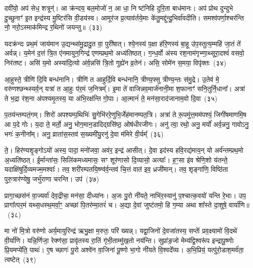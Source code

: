 दवी॑यो॒ अप॑ सेध॒ शत्रून्॑। आ क्र॑न्दय॒ बल॒मोजो॑ न॒ आ धा॒ नि ष्ट॑निहि दुरि॒ता बाध॑मानः। अप॑ प्रोथ दुन्दुभे दु॒च्छुनाꣳ॑ इ॒त इन्द्र॑स्य मु॒ष्टिर॑सि वी॒डय॑स्व। आमूर॑ज प्र॒त्याव॑र्तये॒माः के॑तु॒मद्दु॑न्दु॒भिर्वा॑वदीति। समश्व॑पर्णा॒श्चर॑न्ति नो॒ नरो॒\-ऽस्माक॑मिन्द्र र॒थिनो॑ जयन्तु॥~(३३)

{\anuvakamend[{धन्व॑न्महि॒मानं॒ ब्राह्म॑णा॒सो\-ऽदि॑तिः पृथि॒व्याः परि॑ दू॒रादेक॑चत्वारिꣳशच्च}]}%

यदक्र॑न्दः प्रथ॒मं जाय॑मान उ॒द्यन्थ्स॑मु॒द्रादु॒त वा॒ पुरी॑षात्। श्ये॒नस्य॑ प॒क्षा ह॑रि॒णस्य॑ बा॒हू उ॑प॒स्तुत्य॒म्महि॑ जा॒तं ते॑ अर्वन्न्। य॒मेन॑ द॒त्तं त्रि॒त ए॑नमायुन॒गिन्द्र॑ एणम्प्रथ॒मो अध्य॑तिष्ठत्। ग॒न्ध॒र्वो अ॑स्य रश॒नाम॑गृभ्णा॒थ्सूरा॒दश्वं॑ वसवो॒ निर॑तष्ट। असि॑ य॒मो अस्या॑दि॒त्यो अ॑र्व॒न्नसि॑ त्रि॒तो गुह्ये॑न व्र॒तेन॑। असि॒ सोमे॑न स॒मया॒ विपृ॑क्तः~(३४)

आ॒हुस्ते॒ त्रीणि॑ दि॒वि बन्ध॑नानि। त्रीणि॑ त आहुर्दि॒वि बन्ध॑नानि॒ त्रीण्य॒फ्सु त्रीण्य॒न्तः स॑मु॒द्रे। उ॒तेव॑ मे॒ वरु॑णश्छन्थ्स्यर्व॒न् यत्रा॑ त आ॒हुः प॑र॒मं ज॒नित्रम्᳚। इ॒मा ते॑ वाजिन्नव॒मार्ज॑नानी॒मा श॒फानाꣳ॑ सनि॒तुर्नि॒धाना᳚। अत्रा॑ ते भ॒द्रा र॑श॒ना अ॑पश्यमृ॒तस्य॒ या अ॑भि॒रक्ष॑न्ति गो॒पाः। आ॒त्मानं॑ ते॒ मन॑सा॒राद॑जानाम॒वो दि॒वा~(३५)

प॒तय॑न्तम्पतं॒गम्। शिरो॑ अपश्यम्प॒थिभिः॑ सु॒गेभि॑ररे॒णुभि॒र्जेह॑मानम्पत॒त्रि। अत्रा॑ ते रू॒पमु॑त्त॒मम॑पश्यं॒ जिगी॑षमाणमि॒ष आ प॒दे गोः। य॒दा ते॒ मर्तो॒ अनु॒ भोग॒मान॒डादिद्ग्रसि॑ष्ठ॒ ओष॑धीरजीगः। अनु॑ त्वा॒ रथो॒ अनु॒ मर्यो॑ अर्व॒न्ननु॒ गावो\-ऽनु॒ भगः॑ क॒नीना᳚म्। अनु॒ व्राता॑स॒स्तव॑ स॒ख्यमी॑यु॒रनु॑ दे॒वा म॑मिरे वी॒र्यम्᳚~(३६)

ते॒। हिर॑ण्यशृ॒ङ्गो\-ऽयो॑ अस्य॒ पादा॒ मनो॑जवा॒ अव॑र॒ इन्द्र॑ आसीत्। दे॒वा इद॑स्य हवि॒रद्य॑माय॒न् यो अर्व॑न्तम्प्रथ॒मो अ॒ध्यति॑ष्ठत्। ई॒र्मान्ता॑सः॒ सिलि॑कमध्यमासः॒ सꣳ शूर॑णासो दि॒व्यासो॒ अत्याः᳚। ह॒ꣳ॒सा इ॑व श्रेणि॒शो य॑तन्ते॒ यदाक्षि॑षुर्दि॒व्यमज्म॒मश्वाः᳚। तव॒ शरी॑रम्पतयि॒ष्ण्व॑र्व॒न्तव॑ चि॒त्तं वात॑ इव॒ ध्रजी॑मान्। तव॒ शृङ्गा॑णि॒ विष्ठि॑ता पुरु॒त्रार॑ण्येषु॒ जर्भु॑राणा चरन्ति। उप॑~(३७)

प्रागा॒च्छस॑नं वा॒ज्यर्वा॑ देव॒द्रीचा॒ मन॑सा॒ दीध्या॑नः। अ॒जः पु॒रो नी॑यते॒ नाभि॑र॒स्यानु॑ प॒श्चात्क॒वयो॑ यन्ति रे॒भाः। उप॒ प्रागा᳚त्पर॒मं यथ्स॒धस्थ॒मर्वा॒ꣳ॒ अच्छा॑ पि॒तर॑म्मा॒तरं॑ च। अ॒द्या दे॒वां जुष्ट॑तमो॒ हि ग॒म्या अथा शा᳚स्ते दा॒शुषे॒ वार्या॑णि॥~(३८)

{\anuvakamend[{विपृ॑क्तो दि॒वा वी॒र्य॑मुपैका॒न्नच॑त्वारि॒ꣳ॒शच्च॑}]}%

मा नो॑ मि॒त्रो वरु॑णो अर्य॒मायुरिन्द्र॑ ऋभु॒क्षा म॒रुतः॒ परि॑ ख्यन्न्। यद्वा॒जिनो॑ दे॒वजा॑तस्य॒ सप्तेः᳚ प्रव॒क्ष्यामो॑ वि॒दथे॑ वी॒र्या॑णि। यन्नि॒र्णिजा॒ रेक्ण॑सा॒ प्रावृ॑तस्य रा॒तिं गृ॑भी॒ताम्मु॑ख॒तो नय॑न्ति। सुप्रा॑ङ॒जो मेम्य॑द्वि॒श्वरू॑प इन्द्रापू॒ष्णोः प्रि॒यमप्ये॑ति॒ पाथः॑। ए॒ष च्छागः॑ पु॒रो अश्वे॑न वा॒जिना॑ पू॒ष्णो भा॒गो नी॑यते वि॒श्वदे᳚व्यः। अ॒भि॒प्रियं॒ यत्पु॑रो॒डाश॒मर्व॑ता॒ त्वष्टेत्~(३९)

